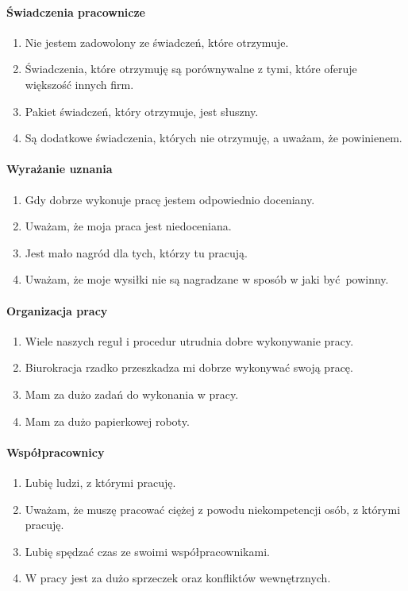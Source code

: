 \paragraph{Świadczenia pracownicze}
\begin{enumerate}
  \item Nie jestem zadowolony ze świadczeń, które otrzymuje.
  \item Świadczenia, które otrzymuję są porównywalne z tymi, które oferuje większość innych firm.
  \item Pakiet świadczeń, który otrzymuje, jest słuszny.
  \item Są dodatkowe świadczenia, których nie otrzymuję, a uważam, że powinienem.
\end{enumerate}

\paragraph{Wyrażanie uznania}
\begin{enumerate}
  \item Gdy dobrze wykonuje pracę jestem odpowiednio doceniany.
  \item Uważam, że moja praca jest niedoceniana.
  \item Jest mało nagród dla tych, którzy tu pracują.
  \item Uważam, że moje wysiłki nie są nagradzane w sposób w jaki być powinny.
\end{enumerate}

\paragraph{Organizacja pracy}
\begin{enumerate}
  \item Wiele naszych reguł i procedur utrudnia dobre wykonywanie pracy.
  \item Biurokracja rzadko przeszkadza mi dobrze wykonywać swoją pracę.
  \item Mam za dużo zadań do wykonania w pracy.
  \item Mam za dużo papierkowej roboty.
\end{enumerate}

\paragraph{Współpracownicy}
\begin{enumerate}
  \item Lubię ludzi, z którymi pracuję.
  \item Uważam, że muszę pracować ciężej z powodu niekompetencji osób, z którymi pracuję.
  \item Lubię spędzać czas ze swoimi współpracownikami.
  \item W pracy jest za dużo sprzeczek oraz konfliktów wewnętrznych.
\end{enumerate}

